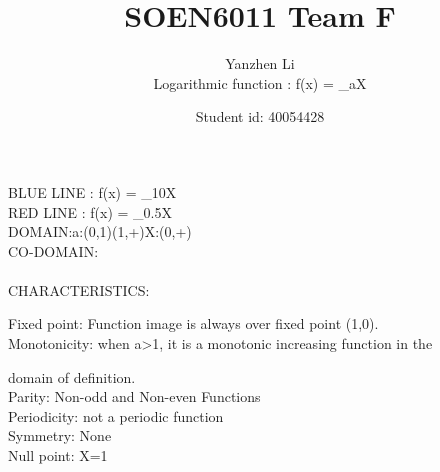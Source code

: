 \documentclass[12pt]{extarticle}
\begin{document}
\title{SOEN6011 Team F}
\author{Yanzhen Li\\
Logarithmic function : f(x) = \log_{a}X}
\date{Student id: 40054428}
\maketitle
\begin{figure}[h]
\centering
{}
\end{figure}
{\color{blue} BLUE LINE}
: f(x) = \log_{10}X\\

{\color{red} RED LINE}
: f(x) = \log_{0.5}X\\

DOMAIN:\qquad a:(0,1)\cup(1,+\infty)\quad X:(0,+\infty)\\

CO-DOMAIN:\qquad {}\\
\\


CHARACTERISTICS:

Fixed point: Function image is always over fixed point (1,0).\\

Monotonicity: when a\textgreater1, it is a monotonic increasing function in the 

domain of definition.\\

Parity: Non-odd and Non-even Functions\\

Periodicity: not a periodic function\\

Symmetry: None\\

Null point: X=1\\
\end{document}
